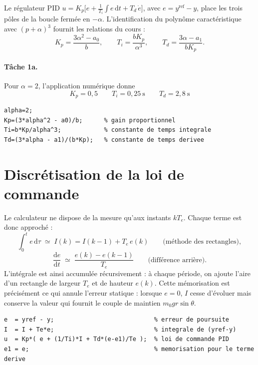 \documentclass[11pt,a4paper]{report}
\begin{document}
Le régulateur PID
$u = K_p\big[e + \frac{1}{T_i}\int e\,\mathrm{d}t + T_d\,\dot{e}\big]$, avec $e = y^{\mathrm{ref}} - y$,
place les trois pôles de la boucle fermée en $-\alpha$. L'identification du polynôme
caractéristique avec $(p+\alpha)^3$ fournit les relations du cours :
\begin{equation}
  K_p = \frac{3\alpha^2 - a_0}{b}, \qquad
  T_i = \frac{b K_p}{\alpha^3}, \qquad
  T_d = \frac{3\alpha - a_1}{b K_p}.
  \label{eq:pid}
\end{equation}

\paragraph{Tâche 1a.} Pour $\alpha = 2$, l'application numérique donne
\begin{equation}
  \boxed{K_p = 0{,}5}\qquad \boxed{T_i = 0{,}25~\mathrm{s}}\qquad \boxed{T_d = 2{,}8~\mathrm{s}}
\end{equation}

\begin{lstlisting}[caption={Tâche 1a : calcul des paramètres du PID}]
alpha=2;
Kp=(3*alpha^2 - a0)/b;      % gain proportionnel
Ti=b*Kp/alpha^3;            % constante de temps integrale
Td=(3*alpha - a1)/(b*Kp);   % constante de temps derivee
\end{lstlisting}

\section{Discrétisation de la loi de commande}

Le calculateur ne dispose de la mesure qu'aux instants $kT_e$. Chaque terme est donc
approché :
\begin{equation}
  \int_0^{t} e\,\mathrm{d}\tau \;\simeq\; I(k) = I(k-1) + T_e\,e(k)
  \qquad\text{(méthode des rectangles)},
\end{equation}
\begin{equation}
  \frac{\mathrm{d}e}{\mathrm{d}t} \;\simeq\; \frac{e(k)-e(k-1)}{T_e}
  \qquad\text{(différence arrière)} .
\end{equation}
L'intégrale est ainsi accumulée récursivement : à chaque période, on ajoute l'aire d'un
rectangle de largeur $T_e$ et de hauteur $e(k)$. Cette mémorisation est précisément ce qui
annule l'erreur statique : lorsque $e = 0$, $I$ cesse d'évoluer mais conserve la valeur qui
fournit le couple de maintien $m_0 g r\sin\theta$.

\begin{lstlisting}[caption={Tâche 1b : loi de commande PID discrétisée}]
e  = yref - y;                            % erreur de poursuite
I  = I + Te*e;                            % integrale de (yref-y)
u  = Kp*( e + (1/Ti)*I + Td*(e-e1)/Te );  % loi de commande PID
e1 = e;                                   % memorisation pour le terme derive
\end{lstlisting}
\end{document}
